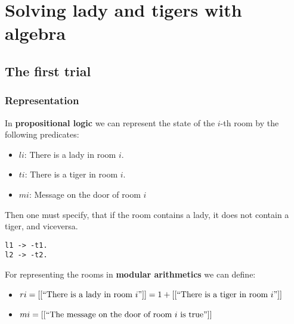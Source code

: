 \section{Solving lady and tigers with algebra} 





\subsection{The first trial}



\subsubsection{Representation}

In \textbf{propositional logic} we can represent the state of the $i$-th room by the following predicates:

\begin{itemize}

\item $li$: There is a lady in room $i$.
\item $ti$: There is a tiger in room $i$.
\item $mi$: Message on the door of room $i$
 
\end{itemize}

Then one must specify, that if the room contains a lady, it does not contain a tiger, and viceversa.

\begin{lstlisting}[numbers=none]
l1 -> -t1.
l2 -> -t2.
\end{lstlisting}


For representing the rooms in \textbf{modular arithmetics} we can define:

\begin{itemize}

\item 
\begin{math}
ri = [[``\textrm{There is a lady in room } i"]] = 1 +  [[``\textrm{There is a tiger in room } i"]] 
\end{math}


\item 
\begin{math}
mi = [[``\textrm{The message on the door of room } i \textrm{ is true}"]]
\end{math}
 
\end{itemize}

